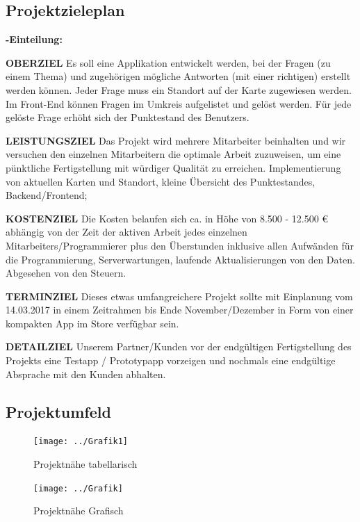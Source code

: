 \subsection{Projektzieleplan}

\textbf {-Einteilung:}


\textbf {OBERZIEL} Es soll eine Applikation entwickelt werden, bei der Fragen (zu einem Thema) und zugehörigen mögliche Antworten (mit einer richtigen) erstellt werden können. Jeder Frage muss ein Standort auf der Karte zugewiesen werden.
Im Front-End können Fragen im Umkreis aufgelistet und gelöst werden. Für jede gelöste Frage erhöht sich der Punktestand des Benutzers.  


\textbf {LEISTUNGSZIEL} Das Projekt wird mehrere Mitarbeiter beinhalten und wir versuchen den einzelnen Mitarbeitern die optimale Arbeit zuzuweisen, um eine pünktliche Fertigstellung mit würdiger Qualität zu erreichen. Implementierung von aktuellen Karten und Standort, kleine Übersicht des Punktestandes, Backend/Frontend;


\textbf {KOSTENZIEL} Die Kosten belaufen sich ca. in Höhe von 8.500 - 12.500 € abhängig von der Zeit der aktiven Arbeit jedes einzelnen Mitarbeiters/Programmierer plus den Überstunden inklusive allen Aufwänden für die Programmierung, Serverwartungen, laufende Aktualisierungen von den Daten. Abgesehen von den Steuern.


\textbf {TERMINZIEL} Dieses etwas umfangreichere Projekt sollte mit Einplanung vom 14.03.2017 in einem Zeitrahmen bis Ende November/Dezember in Form von einer kompakten App im Store verfügbar sein.


\textbf {DETAILZIEL} Unserem Partner/Kunden vor der endgültigen Fertigstellung des Projekts eine Testapp /  Prototypapp vorzeigen und nochmals eine endgültige Absprache mit den Kunden abhalten.



\subsection{Projektumfeld}

\begin{figure}
	\centering
	\texttt{[image: ../Grafik1]}
	\caption{Projektnähe tabellarisch}
	\label{fig:grafik1}
\end{figure}


\begin{figure}
	\centering
	\texttt{[image: ../Grafik]}
	\caption{Projektnähe Grafisch}
	\label{fig:grafik}
\end{figure}




